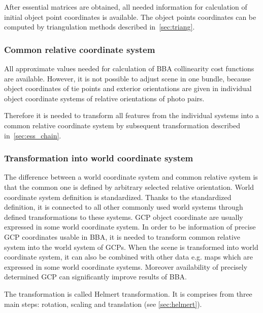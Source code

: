 \documentclass[a4paper,12pt]{article}
\begin{document}
After essential matrices are obtained, all needed information for calculation of initial object point coordinates
is  available. The object points coordinates can be computed by triangulation methods described in~\ref{sec:triang}.


\subsubsection{Common relative coordinate system}

All approximate values needed for calculation of BBA collinearity cost functions are available. 
However, it is not possible to adjust scene in one bundle, because
object coordinates of tie points and exterior orientations are given in individual object coordinate systems
of relative orientations of photo pairs.

Therefore it is needed to transform all features from the individual systems into 
a common relative coordinate system by subsequent transformation described in~\ref{sec:ess_chain}. 

\subsubsection{Transformation into world coordinate system}


The difference between a world coordinate system and common relative system is that the common one 
is defined by arbitrary selected relative orientation. World coordinate system definition is standardized.
Thanks to the standardized definition, it is connected to all other commonly used  world systems through 
defined transformations to these systems.
GCP object coordinate are usually expressed in some world coordinate system. In order to be 
information of precise GCP coordinates usable in BBA, it is needed to transform common relative 
system into the world system of GCPs. When the scene is transformed into world coordinate system,
it can also be combined with other data e.g. maps 
which are expressed in some world coordinate systems. 
Moreover availability of precisely determined GCP can significantly improve results of BBA.  


The transformation is called Helmert transformation. It is comprises from 
three main steps: rotation, scaling and translation (see \ref{sec:helmert}).
\end{document}
